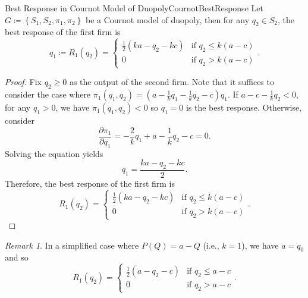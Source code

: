 \documentclass[math]{amznotes}
\theoremstyle{remark}
\newtheorem*{remark}{Remark}
\begin{document}
\begin{probox}{Best Response in Cournot Model of Duopoly}{CournotBestResponse}
    Let $G \coloneqq \left\{S_1, S_2, \pi_1, \pi_2\right\}$ be a Cournot model of duopoly, then for any $q_2 \in S_2$, the best response of the first firm is 
    \begin{equation*}
        q_1 \coloneqq R_1\left(q_2\right) = \begin{cases}
            \frac{1}{2}\left(ka - q_2 - kc\right) & \textrm{if } q_2 \leq k\left(a - c\right) \\
            0 & \textrm{if } q_2 > k\left(a - c\right)
        \end{cases}.
    \end{equation*}
    \tcblower
    \begin{proof}
        Fix $q_2 \geq 0$ as the output of the second firm. Note that it suffices to consider the case where $\pi_1\left(q_1, q_2\right) = \left(a - \frac{1}{k}q_1 - \frac{1}{k}q_2 - c\right)q_1$. If $a - c - \frac{1}{k}q_2 < 0$, for any $q_1 > 0$, we have $\pi_1\left(q_1, q_2\right) < 0$ so $q_1 = 0$ is the best response. Otherwise, consider 
        \begin{equation*}
            \frac{\partial \pi_1}{\partial q_1} = -\frac{2}{k}q_1 + a - \frac{1}{k}q_2 - c = 0.
        \end{equation*} 
        Solving the equation yields 
        \begin{equation*}
            q_1 = \frac{ka - q_2 - kc}{2}.
        \end{equation*}
        Therefore, the best response of the first firm is 
        \begin{equation*}
            R_1\left(q_2\right) =  \begin{cases}
                \frac{1}{2}\left(ka - q_2 - kc\right) & \textrm{if } q_2 \leq k\left(a - c\right) \\
                0 & \textrm{if } q_2 > k\left(a - c\right)
            \end{cases}.
        \end{equation*}
    \end{proof}
\end{probox}
\begin{notebox}
    \begin{remark}
        In a simplified case where $P\left(Q\right) = a - Q$ (i.e., $k = 1$), we have $a = q_0$ and so 
        \begin{equation*}
            R_1\left(q_2\right) = \begin{cases}
                \frac{1}{2}\left(a - q_2 - c\right) & \textrm{if } q_2 \leq a - c \\
                0 & \textrm{if } q_2 > a - c
            \end{cases}.
        \end{equation*}
    \end{remark}
\end{notebox}
\end{document}
